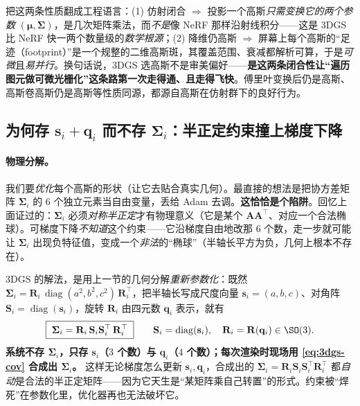 \begin{insight}
把这两条性质翻成工程语言：(1) 仿射闭合 $\Rightarrow$ 投影一个高斯\emph{只需变换它的两个参数} $(\boldsymbol\mu,\boldsymbol\Sigma)$，是几次矩阵乘法，而\emph{不是}像 NeRF 那样沿射线积分——这是 3DGS 比 NeRF 快一两个数量级的\emph{数学根源}；(2) 降维仍高斯 $\Rightarrow$ 屏幕上每个高斯的“足迹（footprint）”是一个规整的二维高斯斑，其覆盖范围、衰减都解析可算，于是\emph{可微}且\emph{易并行}。换句话说，3DGS 选高斯不是审美偏好——\textbf{是这两条闭合性让“遍历图元做可微光栅化”这条路第一次走得通、且走得飞快}。傅里叶变换后仍是高斯、高斯卷高斯仍是高斯等性质同源，都源自高斯在仿射群下的良好行为。
\end{insight}

\subsection{为何存 \texorpdfstring{$\mathbf s_i+\mathbf q_i$}{s_i+ q_i} 而不存 \texorpdfstring{$\boldsymbol\Sigma_i$}{_i}：半正定约束撞上梯度下降}
\label{sec:3dgs-store}

\paragraph{物理分解。}
我们要\emph{优化}每个高斯的形状（让它去贴合真实几何）。最直接的想法是把协方差矩阵 $\boldsymbol\Sigma_i$ 的 $6$ 个独立元素当自由变量，丢给 Adam 去调。\textbf{这恰恰是个陷阱}。回忆上面证过的：$\boldsymbol\Sigma_i$ 必须\emph{对称半正定}才有物理意义（它是某个 $\mathbf A\mathbf A^\top$、对应一个合法椭球）。可梯度下降\emph{不知道}这个约束——它沿梯度自由地改那 $6$ 个数，走一步就可能让 $\boldsymbol\Sigma_i$ 出现负特征值，变成一个\emph{非法}的“椭球”（半轴长平方为负，几何上根本不存在）。

3DGS 的解法，是用上一节的几何分解\emph{重新参数化}：既然 $\boldsymbol\Sigma_i=\mathbf R_i\,\operatorname{diag}(a^2,b^2,c^2)\,\mathbf R_i^\top$，把半轴长写成尺度向量 $\mathbf s_i=(a,b,c)$、对角阵 $\mathbf S_i=\operatorname{diag}(\mathbf s_i)$，旋转 $\mathbf R_i$ 由四元数 $\mathbf q_i$ 表示，就有
\begin{equation}
  \boxed{\;\boldsymbol\Sigma_i=\mathbf R_i\,\mathbf S_i\mathbf S_i^\top\,\mathbf R_i^\top\;}\qquad
  \mathbf S_i=\operatorname{diag}(\mathbf s_i),\quad \mathbf R_i=\mathbf R(\mathbf q_i)\in\SO(3).
  \label{eq:3dgs-cov}
\end{equation}
\textbf{系统不存 $\boldsymbol\Sigma_i$，只存 $\mathbf s_i$（$3$ 个数）与 $\mathbf q_i$（$4$ 个数）；每次渲染时现场用 \cref{eq:3dgs-cov} 合成出 $\boldsymbol\Sigma_i$。} 这样无论梯度怎么更新 $\mathbf s_i,\mathbf q_i$，合成出的 $\boldsymbol\Sigma_i=\mathbf R_i\mathbf S_i\mathbf S_i^\top\mathbf R_i^\top$ 都\emph{自动}是合法的半正定矩阵——因为它天生是“某矩阵乘自己转置”的形式。约束被“焊死”在参数化里，优化器再也无法破坏它。

